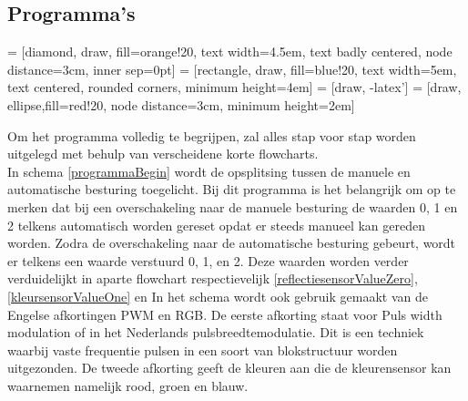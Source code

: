 \documentclass[a4paper,twoside,kulak]{kulakreport} %
\begin{document}
\subsection{Programma's}\label{definitieve programma's}
 = [diamond, draw, fill=orange!20, text width=4.5em, text badly centered, node distance=3cm, inner sep=0pt]
 = [rectangle, draw, fill=blue!20, text width=5em, text centered, rounded corners, minimum height=4em]
 = [draw, -latex']
 = [draw, ellipse,fill=red!20, node distance=3cm,
minimum height=2em]


Om het programma volledig te begrijpen, zal alles stap voor stap worden uitgelegd met behulp van verscheidene korte flowcharts. \\

In schema \ref{programmaBegin} wordt de opsplitsing tussen de manuele en automatische besturing toegelicht. Bij dit programma is het belangrijk om op te merken dat bij een overschakeling naar de manuele besturing de waarden 0, 1 en 2 telkens automatisch worden gereset opdat er steeds manueel kan gereden worden. %
Zodra de overschakeling naar de automatische besturing gebeurt, wordt er telkens een waarde verstuurd 0, 1, en 2. Deze waarden worden verder verduidelijkt in aparte flowchart respectievelijk \ref{reflectiesensorValueZero}, \ref{kleursensorValueOne} en %
In het schema wordt ook gebruik gemaakt van de Engelse afkortingen PWM en RGB. De eerste afkorting staat voor Puls width modulation of in het Nederlands pulsbreedtemodulatie. Dit is een techniek waarbij vaste frequentie pulsen in een soort van blokstructuur worden uitgezonden.%
De tweede afkorting geeft de kleuren aan die de kleurensensor kan waarnemen namelijk rood, groen en blauw.
\\
\end{document}
